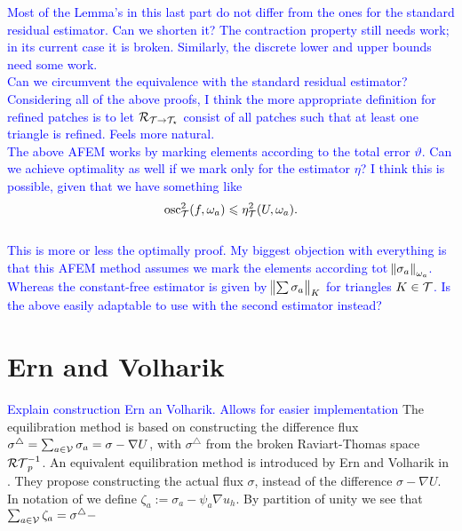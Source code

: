 \documentclass[thesis.tex]{subfiles}
\begin{document}
\textcolor{blue}{
  Most of the Lemma's in this last part do not differ from the ones for the standard residual estimator. Can we
  shorten it? The contraction property still needs work; in its current case it is broken.  Similarly,
  the discrete lower and upper bounds need some work. 
  \\
  Can we circumvent the equivalence with the standard residual estimator?
  \\
  Considering all of the above proofs, I think the more appropriate definition for refined patches is to let 
  $\mathcal{R}_{\mathcal{T} \to \mathcal{T}_\star}$ consist of all patches such that at least one triangle is refined. Feels more natural.
  \\
  The above AFEM works by marking elements according to the total error $\vartheta$. Can we achieve
  optimality as well if we mark only for the estimator $\eta$? I think this is possible, given that we have something like
  \[
    \operatorname{osc}_{\mathcal{T}}^2(f,\omega_a) \leqslant \eta_{\mathcal{T}}^2(U, \omega_a).
  \]
  \\
  This is more or less the optimally proof. My biggest objection with everything is that this AFEM method assumes
  we mark the elements according tot $\norm{\sigma_a}_{\omega_a}$. Whereas the constant-free
  estimator is given by $\norm{\sum \sigma_a}_{K}$ for triangles $K \in \mathcal{T}$.
Is the above easily adaptable to use with the second estimator instead?
}


\section{Ern and Volharik}
\textcolor{blue}{Explain construction Ern an Volharik. Allows for easier implementation}
The equilibration method is based on constructing the difference flux $\sigma^\triangle = \sum_{a \in \mathcal{V}} \sigma_a =  \sigma - \nabla U$,
with $\sigma^\triangle$ from the broken Raviart-Thomas space $\mathcal{RT}_p^{-1}$. 
An equivalent equilibration method is introduced by Ern and Volharik in \cite{ernequil}. They
propose constructing the actual flux $\sigma$, instead of the difference $\sigma - \nabla U$. 
\textcolor{Actually, I think there is a minus sign missing somewhere, shouldn't we have $\sigma^\triangle = \nabla U - \sigma$?}

In notation of \cite{ernequil} we define $\zeta_a := \sigma_a - \psi_a \nabla u_h$. By partition of unity we see that 
$\sum_{a \in \mathcal{V}} \zeta_a = \sigma^\triangle - $
\end{document}
